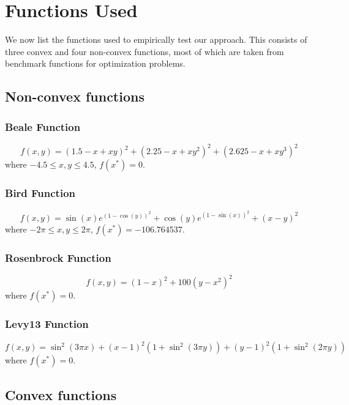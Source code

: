 \documentclass{article}
\begin{document}
\section{Functions Used}\label{functions}
We now list the functions used to empirically test our approach. This consists of three convex and four non-convex functions, most of which are taken from benchmark functions for optimization problems.

\subsection{Non-convex functions}

\subsubsection{Beale Function}
\begin{equation}
f(x,y) = (1.5 - x + xy)^2 + (2.25 - x + xy^2)^2 + (2.625 - x + xy^3)^2	
\end{equation}
where $-4.5\le x,y \le 4.5$, $f(x^*)=0$.

\subsubsection{Bird Function}
\begin{equation}
f(x,y) = \sin(x)e^{(1-\cos(y))^2} + \cos(y)e^{(1-\sin(x))^2} + (x-y)^2
\end{equation}
where $-2\pi \le x,y \le 2\pi$, $f(x^*)=-106.764537$.

\subsubsection{Rosenbrock Function}
\begin{equation}
f(x,y) = (1-x)^2 + 100(y-x^2)^2
\end{equation}
where $f(x^*)=0$.

\subsubsection{Levy13 Function}
\begin{equation}
f(x,y) = \sin^2(3\pi x) + (x-1)^2\left(1+\sin^2(3\pi y)\right) + (y-1)^2\left(1+\sin^2(2\pi y)\right)
\end{equation}
where $f(x^*)=0$.

\subsection{Convex functions}
\end{document}
